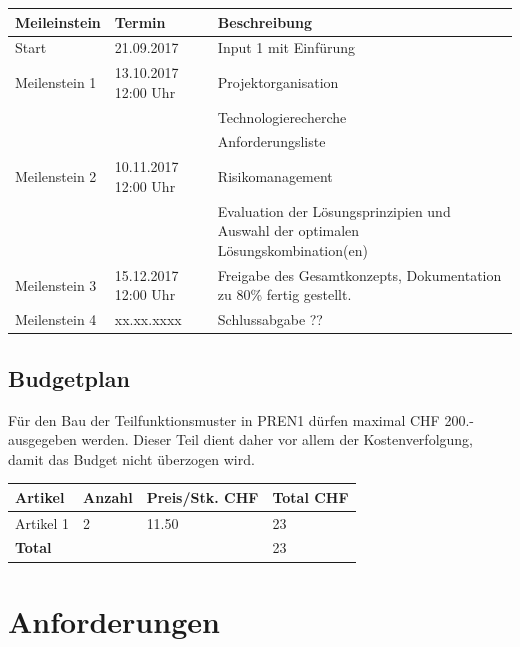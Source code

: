 \documentclass[a4paper]{report}
\begin{document}
\vspace{1em}
\noindent
\begin{tabular}{|p{}|p{}|p{}|}
	\hline
	\textbf{Meileinstein} & \textbf{Termin} & \textbf{Beschreibung} \\
	\hline
	Start & 21.09.2017 & Input 1 mit Einfürung \\
	\hline
	Meilenstein 1 & 13.10.2017 12:00 Uhr & Projektorganisation \\
	& & Technologierecherche \\
	& & Anforderungsliste \\
	\hline
	Meilenstein 2 & 10.11.2017 12:00 Uhr & Risikomanagement \\
	& & Evaluation der Lösungsprinzipien und Auswahl der optimalen Lösungskombination(en) \\
	\hline
	Meilenstein 3 & 15.12.2017 12:00 Uhr & Freigabe des Gesamtkonzepts, Dokumentation zu 80\% fertig gestellt. \\
	\hline
	Meilenstein 4 & xx.xx.xxxx & Schlussabgabe ?? \\
	\hline
\end{tabular}

\section{Budgetplan}
Für den Bau der Teilfunktionsmuster in PREN1 dürfen maximal CHF 200.- ausgegeben werden. Dieser Teil dient daher vor allem der Kostenverfolgung, damit das Budget nicht überzogen wird.

\vspace{1em}
\noindent
\begin{tabular}{|p{}|p{}|p{}|p{}|}
	\hline
	\textbf{Artikel} & \textbf{Anzahl} & \textbf{Preis/Stk. CHF} & \textbf{Total CHF} \\
	\hline
	Artikel 1 & 2 & 11.50 & 23 \\
	\hline
	\textbf{Total} & & & 23 \\
	\hline
\end{tabular}


\chapter{Anforderungen}
\end{document}
